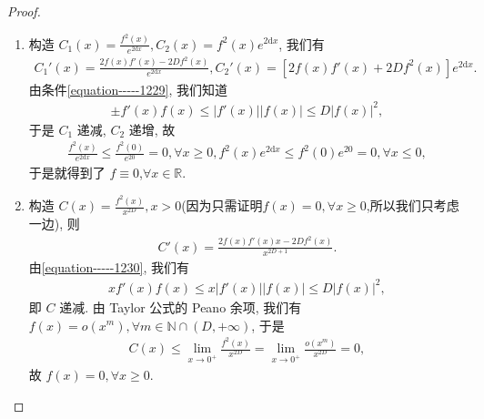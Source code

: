 \documentclass[../../main.tex]{subfiles}
\begin{document}
\begin{proof}
\begin{enumerate}
\item 构造 $C_1(x)=\frac{f^2(x)}{e^{2\mathrm{d}x}},C_2(x)=f^2(x)e^{2\mathrm{d}x}$, 我们有
\begin{align*}
C_1'(x)=\frac{2f(x)f'(x)-2Df^2(x)}{e^{2\mathrm{d}x}},C_2'(x)=[2f(x)f'(x)+2Df^2(x)]e^{2\mathrm{d}x}.
\end{align*}
由条件\eqref{equation-----1229}, 我们知道
\begin{align*}
\pm f'(x)f(x)\leqslant|f'(x)||f(x)|\leqslant D|f(x)|^2,
\end{align*}
于是 $C_1$ 递减, $C_2$ 递增, 故
\begin{align*}
\frac{f^2(x)}{e^{2\mathrm{d}x}}\leqslant\frac{f^2(0)}{e^{20}}=0,\forall x\geqslant0,f^2(x)e^{2\mathrm{d}x}\leqslant f^2(0)e^{20}=0,\forall x\leqslant0,
\end{align*}
于是就得到了 $f\equiv0$,$\forall x\in \mathbb{R}$.

\item 构造 $C(x)=\frac{f^2(x)}{x^{2D}},x>0$(因为只需证明$f(x)=0,\forall x\geqslant0$,所以我们只考虑一边), 则
\begin{align*}
C'(x)=\frac{2f(x)f'(x)x - 2Df^2(x)}{x^{2D + 1}}.
\end{align*}
由\eqref{equation-----1230}, 我们有
\begin{align*}
xf'(x)f(x)\leqslant x|f'(x)||f(x)|\leqslant D|f(x)|^2,
\end{align*}
即 $C$ 递减. 由 Taylor 公式的 Peano 余项, 我们有 $f(x)=o(x^m),\forall m\in\mathbb{N}\cap (D,+\infty)$, 于是 
\begin{align*}
C(x)\leqslant \lim_{x\rightarrow 0^+} \frac{f^2(x)}{x^{2D}}=\lim_{x\rightarrow 0^+} \frac{o\left( x^m \right)}{x^{2D}}=0,
\end{align*}
故 $f(x)=0,\forall x\geqslant0$. 
\end{enumerate}

\end{proof}
\end{document}
